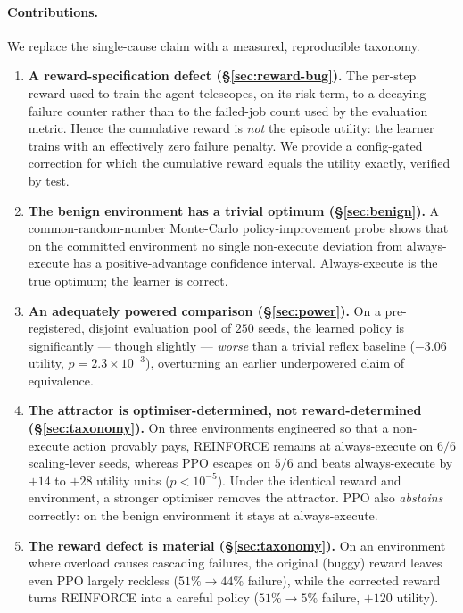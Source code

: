 \documentclass[10pt,twocolumn]{article}
\begin{document}
\paragraph{Contributions.} We replace the single-cause claim with a measured,
reproducible taxonomy.
\begin{enumerate}
\item \textbf{A reward-specification defect (\S\ref{sec:reward-bug}).} The
per-step reward used to train the agent telescopes, on its risk term, to a
decaying failure counter rather than to the failed-job count used by the
evaluation metric. Hence the cumulative reward is \emph{not} the episode utility:
the learner trains with an effectively zero failure penalty. We provide a
config-gated correction for which the cumulative reward equals the utility
exactly, verified by test.
\item \textbf{The benign environment has a trivial optimum
(\S\ref{sec:benign}).} A common-random-number Monte-Carlo policy-improvement
probe shows that on the committed environment no single non-execute deviation
from always-execute has a positive-advantage confidence interval. Always-execute
is the true optimum; the learner is correct.
\item \textbf{An adequately powered comparison (\S\ref{sec:power}).} On a
pre-registered, disjoint evaluation pool of $250$ seeds, the learned policy is
significantly --- though slightly --- \emph{worse} than a trivial reflex
baseline ($-3.06$ utility, $p=2.3\times10^{-3}$), overturning an earlier
underpowered claim of equivalence.
\item \textbf{The attractor is optimiser-determined, not reward-determined
(\S\ref{sec:taxonomy}).} On three environments engineered so that a non-execute
action provably pays, REINFORCE remains at always-execute on $6/6$
scaling-lever seeds, whereas PPO escapes on $5/6$ and beats always-execute by
$+14$ to $+28$ utility units ($p<10^{-5}$). Under the identical reward and
environment, a stronger optimiser removes the attractor. PPO also \emph{abstains}
correctly: on the benign environment it stays at always-execute.
\item \textbf{The reward defect is material (\S\ref{sec:taxonomy}).} On an
environment where overload causes cascading failures, the original (buggy)
reward leaves even PPO largely reckless ($51\%\!\to\!44\%$ failure), while the
corrected reward turns REINFORCE into a careful policy ($51\%\!\to\!5\%$ failure,
$+120$ utility).
\end{enumerate}
\end{document}
